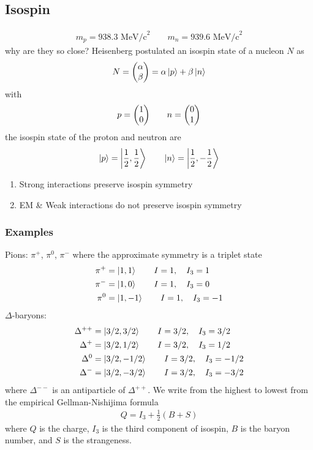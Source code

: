 \documentclass[../main.tex]{subfiles}
\begin{document}
\subsection*{Isospin}
\begin{align*}
    m_p = 938.3 \textrm{ MeV/c}^2 \qquad m_n = 939.6 \textrm{ MeV/c}^2
\end{align*}
why are they so close? Heisenberg postulated an isospin state of a nucleon $N$ as
\begin{align*}
    N = \mqty(\alpha \\ \beta) = \alpha \ket{p} + \beta \ket{n}
\end{align*}
with
\begin{align*}
    p = \mqty(1 \\ 0) \qquad n = \mqty(0 \\ 1)
\end{align*}
the isospin state of the proton and neutron are
\begin{align*}
    \ket{p} = \ket{\frac{1}{2}, \frac{1}{2}} \qquad \ket{n} = \ket{\frac{1}{2}, -\frac{1}{2}}
\end{align*}
\newcommand{\half}{\frac{1}{2}}

\begin{enumerate}
    \item Strong interactions preserve isospin symmetry
    \item EM \& Weak interactions do not preserve isospin symmetry
\end{enumerate}

\subsubsection*{Examples}
Pions: $\pi^+$, $\pi^0$, $\pi^-$ where the approximate symmetry is a triplet state
\begin{align*}
    \pi^+ &= \ket{1, 1} \qquad I = 1, \quad I_3 = 1 \\
    \pi^- &= \ket{1, 0} \qquad I = 1, \quad I_3 = 0 \\ 
    \pi^0 &= \ket{1, -1} \qquad I = 1, \quad I_3 = -1
\end{align*}
$\Delta$-baryons:
\begin{align*}
    \Delta^{++} &= \ket{3/2, 3/2} \qquad I = 3/2, \quad I_3 = 3/2 \\
    \Delta^{+} &= \ket{3/2, 1/2} \qquad I = 3/2, \quad I_3 = 1/2 \\
    \Delta^{0} &= \ket{3/2, -1/2} \qquad I = 3/2, \quad I_3 = -1/2 \\
    \Delta^{-} &= \ket{3/2, -3/2} \qquad I = 3/2, \quad I_3 = -3/2 \\
\end{align*}
where $\Delta^{--}$ is an antiparticle of $\Delta^{++}$. We write from the highest to lowest
from the empirical Gellman-Nishijima formula
\begin{align*}
    Q = I_3 + \frac{1}{2} (B + S)
\end{align*}
where $Q$ is the charge, $I_3$ is the third component of isospin, $B$ is the baryon number, and $S$
is the strangeness.
\end{document}

